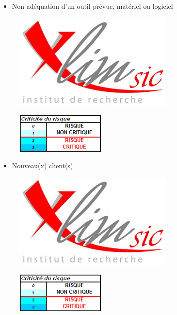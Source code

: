 \documentclass{beamer}
\begin{document}
	\begin{frame}{\secname}
		\begin{itemize}
			\item Non ad\'equation d'un outil prévue, matériel ou logiciel
		\end{itemize}
		\begin{figure}
			\includegraphics[width=8cm]{../Images/logo-Xlim.png} %
		\end{figure}
		\begin{figure}
			\includegraphics[height=2cm]{../Images/legende_risque.png}
		\end{figure}
	\end{frame}


	\begin{frame}{\secname}
		\begin{itemize}
			\item Nouveau(x) client(s)
		\end{itemize}
		\begin{figure}
			\includegraphics[width=8cm]{../Images/logo-Xlim.png} %
		\end{figure}
		\begin{figure}
			\includegraphics[height=2cm]{../Images/legende_risque.png}
		\end{figure}
	\end{frame}
\end{document}
